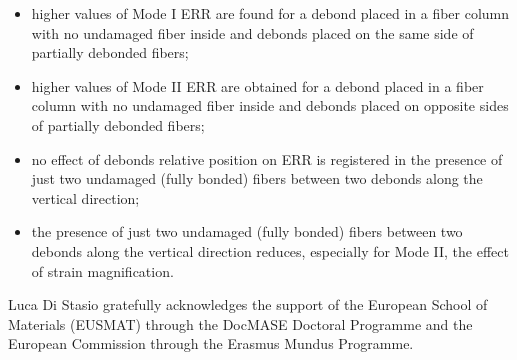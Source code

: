 \documentclass[smallextended]{svjour3}       %
\begin{document}
\begin{itemize}
\item higher values of Mode I ERR are found for a debond placed in a fiber column with no undamaged fiber inside and debonds placed on the same side of partially debonded fibers;
\item higher values of Mode II ERR are obtained for a debond placed in a fiber column with no undamaged fiber inside and debonds placed on opposite sides of partially debonded fibers;
\item no effect of debonds relative position on ERR is registered in the presence of just two undamaged (fully bonded) fibers between two debonds along the vertical direction;
\item the presence of just two undamaged (fully bonded) fibers between two debonds along the vertical direction reduces, especially for Mode II, the effect of strain magnification.
\end{itemize}



\begin{acknowledgements}
Luca Di Stasio gratefully acknowledges the support of the European School of Materials (EUSMAT) through the DocMASE Doctoral Programme and the European Commission through the Erasmus Mundus Programme.
\end{acknowledgements}


%
%



\end{document}
